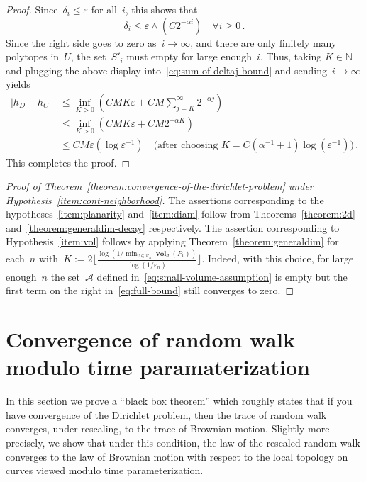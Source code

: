 \documentclass[12pt]{amsart}
\numberwithin{equation}{section}
\newcommand{\V}{\mathcal{V}}
\newcommand{\eps}{\varepsilon}
\DeclareMathOperator{\vol}{\mathbf{vol}}
\begin{document}
\begin{proof}
	Since~$\delta_i \leq \eps$ for all~$i$, this shows that 
	\[
	{\delta_i \leq \eps \wedge (C 2^{- \alpha  i}) \quad \forall i \geq 0 \, . }
	\]
	Since the right side goes to zero as~$i \to \infty$, and there are only finitely many polytopes in~$U$, the set~$S'_{i}$ must empty
	for large enough~$i$. Thus, taking $K \in \mathbb N$ and plugging the above display into~\eqref{eq:sum-of-deltaj-bound} and sending~$i \to \infty$ {yields 
\begin{align*}
	|h_D - h_C|  &\leq \inf_{K >0}   \left( C M K \eps + C M \sum_{j=K}^{\infty}    2^{-\alpha j} \right) \\
	&\leq \inf_{K >0}   \left( C M K \eps + C M 2^{-\alpha K} \right) \\
	&\leq C M \eps (\log \eps^{-1})   \quad \mbox{(after choosing~$K = C (\alpha^{-1}+1) \log(\eps^{-1})$)} \, .
\end{align*}}
This completes the proof. 
\end{proof}



\begin{proof}[Proof of Theorem~\ref{theorem:convergence-of-the-dirichlet-problem} under Hypothesis~\ref{item:cont-neighborhood}]
	The assertions corresponding to the hypotheses~\ref{item:planarity} and~\ref{item:diam} follow from Theorems~\ref{theorem:2d} and~\ref{theorem:generaldim-decay} respectively. The assertion corresponding to Hypothesis~\ref{item:vol} follows by applying Theorem~\ref{theorem:generaldim} for each~$n$
	with~$K := 2 \lfloor \frac{\log(1/\min_{v \in \V_n} \vol_{d}(P_v)) }{\log(1/\eps_n)} \rfloor$. Indeed, with this choice, for large enough~$n$ the set~$\mathcal{A}$ defined in~\eqref{eq:small-volume-assumption} is empty but the first term on the right in~\eqref{eq:full-bound} still converges to zero. 
\end{proof}







\section{Convergence of random walk modulo time paramaterization} 
\label{sec:rw-convergence}
In this section we prove a ``black box theorem'' which roughly states that if you have convergence of the Dirichlet 
problem, then the trace of random walk converges, under rescaling, to the trace of Brownian motion. Slightly more precisely,  we show that under this condition, the law of the rescaled random walk converges to the law of Brownian motion with respect to the local topology on curves viewed modulo time parameterization. 
\end{document}
